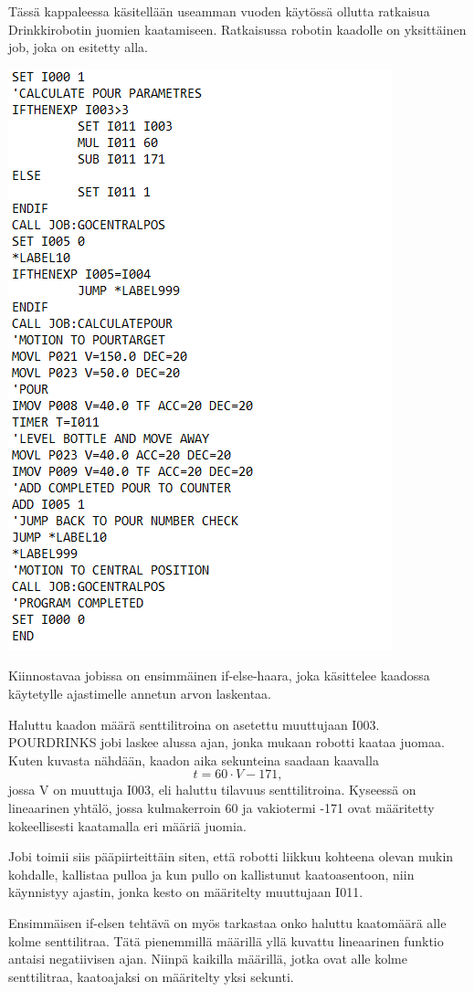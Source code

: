 Tässä kappaleessa käsitellään useamman vuoden käytössä ollutta ratkaisua Drinkkirobotin juomien kaatamiseen.  Ratkaisussa robotin kaadolle on yksittäinen job, joka on esitetty alla.

\includegraphics{img/POURDRINKS.png}

Kiinnostavaa jobissa on ensimmäinen if-else-haara, joka käsittelee kaadossa käytetylle ajastimelle annetun arvon laskentaa.

Haluttu kaadon määrä senttilitroina on asetettu muuttujaan I003. POURDRINKS jobi laskee alussa ajan, jonka mukaan robotti kaataa juomaa. Kuten kuvasta nähdään, kaadon aika sekunteina saadaan kaavalla
\[t = 60 \cdot V - 171, \]
jossa V on muuttuja I003, eli haluttu tilavuus senttilitroina. Kyseessä on lineaarinen yhtälö, jossa kulmakerroin 60 ja vakiotermi -171 ovat määritetty kokeellisesti kaatamalla eri määriä juomia.

Jobi toimii siis pääpiirteittäin siten, että robotti liikkuu kohteena olevan mukin kohdalle, kallistaa pulloa ja kun pullo on kallistunut kaatoasentoon, niin käynnistyy ajastin, jonka kesto on määritelty muuttujaan I011.

Ensimmäisen if-elsen tehtävä on myös tarkastaa onko haluttu kaatomäärä alle kolme senttilitraa. Tätä pienemmillä määrillä yllä kuvattu lineaarinen funktio antaisi negatiivisen ajan. Niinpä kaikilla määrillä, jotka ovat alle kolme senttilitraa, kaatoajaksi on määritelty yksi sekunti.
